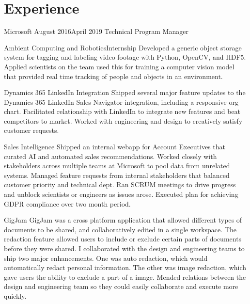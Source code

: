 \documentclass[]{../resume}
\author{Caleb Thorsteinson}
\begin{document}

\section{Experience}

\begin{employer}[../microsoft]{Microsoft} {August 2016}{April 2019}
  {Technical Program Manager}
\begin{team}{Ambient Computing and Robotics}{Internship}
  Developed a generic object storage system
  for tagging and labeling
  video footage
  with Python, OpenCV, and HDF5.
  Applied scientists on the team
  used this for training a computer vision model
  that provided real time tracking
  of people and objects in an environment.
\end{team}
\begin{team}{Dynamics 365 LinkedIn Integration}{}
  Shipped several major feature updates
  to the Dynamics 365 LinkedIn Sales Navigator integration,
  including a responsive org chart.
  Facilitated relationship with LinkedIn
  to integrate new features
  and beat competitors to market.
  Worked with engineering and design
  to creatively satisfy customer requests.
\end{team}
\begin{team}{Sales Intelligence}{}
  Shipped an internal webapp
  for Account Executives
  that curated AI and automated sales recommendations.
  Worked closely with stakeholders
  across multiple teams at Microsoft
  to pool data from unrelated systems.
  Managed feature requests
  from internal stakeholders
  that balanced customer priority
  and technical dept.
  Ran SCRUM meetings
  to drive progress
  and unblock scientists or engineers
  as issues arose.
  Executed plan for achieving GDPR compliance
  over two month period.
\end{team}
\begin{team}{GigJam}{}
  GigJam was a cross platform application
  that allowed different types of documents
  to be shared,
  and collaboratively edited
  in a single workspace.
  The redaction feature
  allowed users to include or exclude
  certain parts of documents before they were shared.
  I collaborated with the design and engineering teams
  to ship two major enhancements.
  One was auto redaction,
  which would automatically redact personal information.
  The other was image redaction,
  which gave users
  the ability to exclude a part of a image.
  Mended relations between the design and engineering team
  so they could easily collaborate
  and execute more quickly.
\end{team}
\end{employer}
\end{document}
